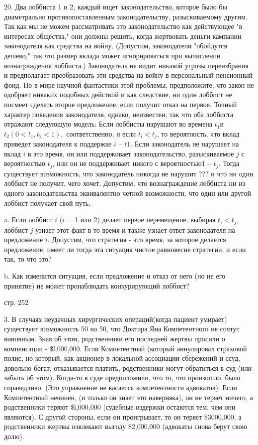 \documentclass[a4paper,12pt]{article}
\begin{document}
20. Два лоббиста 1 и 2, каждый ищет
законодательство, которое было бы диаметрально
противопоставленным законодательству,
разыскиваемому другим. Так как мы не можем
рассматривать это законодательство как действующее
"в интересах общества," они должны решить, когда
жертвовать деньги кампании законодателя как
средства на войну. (Допустим, законодатели
"обойдутся дешево," так что размер вклада может
игнорироваться при вычислении вознаграждения
лоббиста.) Законодатель не видит никакой угрозы
переизбрания и предполагает преобразовать эти
средства на войну в персональный пенсионный фонд.
Но в мире научной фантастики этой проблемы,
предположите, что закон не одобряет никаких
подобных действий и как следствие, ни один лоббист
не посмеет сделать второе предложение, если получит
отказ на первое. Точный характер поведения
законодателя, однако, неизвестен, так что оба
лоббиста отражают следующую модель: Если лоббисты
нарушают во времена $t_{1}$и
$t_{2}(0<t_{1},t_{2}<1),$ соответственно, и если
$t_{i}<t_{j}$, то вероятность, что вклад приведет
законодателя к поддержке $i$ -- $t1$. Если
законодатель не нарушает на вклад $i$ в это время,
он или поддерживает законодательство, разыскиваемое
$j$ с вероятностью $t_{j}$, или он не поддерживает
никого с вероятностью$1-t_{j}$. Тогда существует
возможность, что законодатель никогда не нарушит
??? и что ни один лоббист не получит, чего хочет.
Допустим, что вознаграждение лоббиста ни из одного
законодательства эквивалентно четной возможности,
что один или другой лоббист получает свой путь.

a. Если лоббист $i$ ($i$ = 1 или 2) делает первое
перемещение, выбирая $t_{i}<t_{j}$, лоббист $j$
узнает этот факт в то время и также узнает ответ
законодателя на предложение $i$. Допустим, что
стратегия - это время, за которое делается
предложение, имеет ли тогда эта ситуация чистое
равновесие стратегии, и если так, то что это?

b. Как изменится ситуация, если предложение и отказ
от него (но не его принятие) не может пронаблюдать
конкурирующий лоббист?

стр. 252

3. В случаях неудачных хирургических операций(когда
пациент умирает) существует возможность 50 на 50,
что Доктора Яна Компетентного не сочтут виновным.
Зная об этом, родственники его последней жертвы
просили о компенсации - \$l,000,000. Если
Компетентный (который аннулировал страховой полис,
но который, как акционер в локальной ассоциации
сбережений и ссуд, довольно богат, отказывается
платить, родственники могут обратиться в суд (или
забыть об этом). Когда-то в суде предположили, что
то, что произошло, было справедливо. (Это
упражнение не касается компетентности адвокатов).
Если Компетентный невинен, (и только он знает это
наверняка), он не теряет ничего, а родственники
теряют \$l,000,000 (судебные издержки остаются тем,
чем они являются). С другой стороны, если он
проигрывает, то он теряет \$3000,000, а
родственники жертвы извлекают выгоду \$2,000,000
(адвокаты снова берут свою долю).
\end{document}
